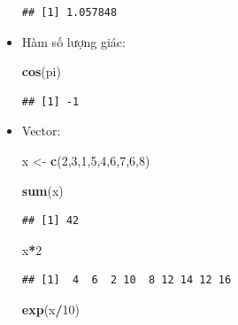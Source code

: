 \documentclass[
]{book}
\newenvironment{Shaded}{\begin{snugshade}}{\end{snugshade}}
\newcommand{\DecValTok}[1]{\textcolor[rgb]{0.00,0.00,0.81}{#1}}
\newcommand{\KeywordTok}[1]{\textcolor[rgb]{0.13,0.29,0.53}{\textbf{#1}}}
\newcommand{\NormalTok}[1]{#1}
\newcommand{\OperatorTok}[1]{\textcolor[rgb]{0.81,0.36,0.00}{\textbf{#1}}}
\newcommand{\StringTok}[1]{\textcolor[rgb]{0.31,0.60,0.02}{#1}}
\begin{document}
\begin{itemize}
\begin{verbatim}
## [1] 1.057848
\end{verbatim}
\item
  Hàm số lượng giác:

\begin{Shaded}
\begin{Highlighting}[]
\KeywordTok{cos}\NormalTok{(pi)}
\end{Highlighting}
\end{Shaded}

\begin{verbatim}
## [1] -1
\end{verbatim}
\item
  Vector:

\begin{Shaded}
\begin{Highlighting}[]
\NormalTok{x \textless{}{-}}\StringTok{ }\KeywordTok{c}\NormalTok{(}\DecValTok{2}\NormalTok{,}\DecValTok{3}\NormalTok{,}\DecValTok{1}\NormalTok{,}\DecValTok{5}\NormalTok{,}\DecValTok{4}\NormalTok{,}\DecValTok{6}\NormalTok{,}\DecValTok{7}\NormalTok{,}\DecValTok{6}\NormalTok{,}\DecValTok{8}\NormalTok{)}
\end{Highlighting}
\end{Shaded}

\begin{Shaded}
\begin{Highlighting}[]
\KeywordTok{sum}\NormalTok{(x)}
\end{Highlighting}
\end{Shaded}

\begin{verbatim}
## [1] 42
\end{verbatim}

\begin{Shaded}
\begin{Highlighting}[]
\NormalTok{x}\OperatorTok{*}\DecValTok{2}
\end{Highlighting}
\end{Shaded}

\begin{verbatim}
## [1]  4  6  2 10  8 12 14 12 16
\end{verbatim}

\begin{Shaded}
\begin{Highlighting}[]
\KeywordTok{exp}\NormalTok{(x}\OperatorTok{/}\DecValTok{10}\NormalTok{)}
\end{Highlighting}
\end{Shaded}


\end{itemize}
\end{document}
